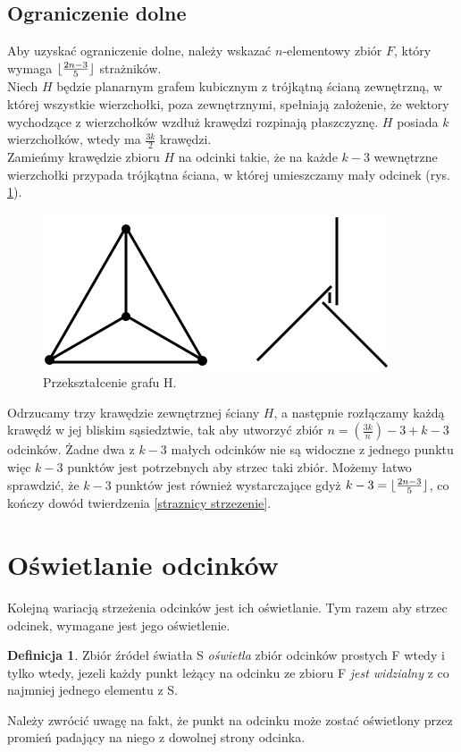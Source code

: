 \documentclass[brudnopis]{xmgr}
\DeclarePairedDelimiter\floor{\lfloor}{\rfloor}
\theoremstyle{definition}
\newtheorem{Definicja}{Definicja}
\begin{document}
\subsection{Ograniczenie dolne}
\indent Aby uzyskać ograniczenie dolne, należy wskazać $n$-elementowy zbiór $F$, który wymaga $\floor{\frac{2n-3}{5}}$ strażników.
\\\indent Niech $H$ będzie planarnym grafem kubicznym z trójkątną ścianą zewnętrzną, w której wszystkie wierzchołki, poza zewnętrznymi, spełniają założenie, że wektory wychodzące z wierzchołków wzdłuż krawędzi rozpinają płaszczyznę. $H$ posiada $k$ wierzchołków, wtedy ma $\frac{3k}{2}$ krawędzi.
\\\indent Zamieńmy krawędzie zbioru $H$ na odcinki takie, że na każde $k - 3$ wewnętrzne wierzchołki przypada trójkątna ściana, w której umieszczamy mały odcinek (rys. \ref{fig:przeksztalcenie h}).
\begin{figure}[ht!]
 \centering
  \includegraphics{rysunki/dolna_granica.png}
  \caption{Przekształcenie grafu H.}
  \label{fig:przeksztalcenie h}
\end{figure} 
Odrzucamy trzy krawędzie zewnętrznej ściany $H$, a następnie rozłączamy każdą krawędź w jej bliskim sąsiedztwie, tak aby utworzyć zbiór $n = (\frac{3k}{n}) - 3 + k  - 3$ odcinków. Żadne dwa z $k - 3$ małych odcinków nie są widoczne z jednego punktu więc $k - 3$ punktów jest potrzebnych aby strzec taki zbiór. Możemy łatwo sprawdzić, że $k - 3$ punktów jest również wystarczające gdyż $k - 3 = \floor{\frac{2n - 3}{5}}$, co kończy dowód twierdzenia \ref{straznicy strzezenie}.

\section{Oświetlanie odcinków}\label{oświetlanie odcinków}
Kolejną wariacją strzeżenia odcinków jest ich oświetlanie. Tym razem aby strzec odcinek, wymagane jest jego oświetlenie.
\begin{Definicja}
	Zbiór źródeł światła S \emph{oświetla} zbiór odcinków prostych F wtedy i tylko wtedy, jezeli każdy punkt leżący na odcinku ze zbioru F \emph{jest widzialny} z co najmniej jednego elementu z S.
\end{Definicja} Należy zwrócić uwagę na fakt, że punkt na odcinku może zostać oświetlony przez promień padający na niego z dowolnej strony odcinka.
\end{document}
